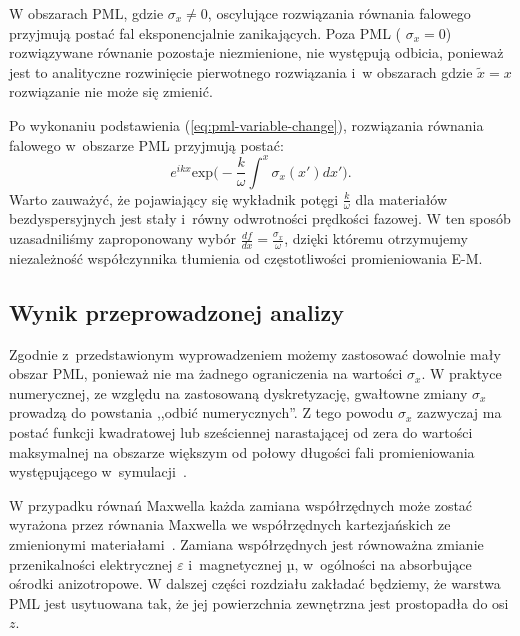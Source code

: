 W obszarach PML, gdzie $\sigma_x\ne0$, oscylujące rozwiązania równania falowego przyjmują postać fal eksponencjalnie zanikających. Poza PML ( $\sigma_x=0$) rozwiązywane równanie pozostaje niezmienione, nie występują odbicia, ponieważ jest to analityczne rozwinięcie pierwotnego rozwiązania i~w obszarach gdzie $\tilde{x}=x$ rozwiązanie nie może się zmienić.

Po wykonaniu podstawienia (\ref{eq:pml-variable-change}), rozwiązania równania falowego w~obszarze PML przyjmują postać:
\begin{equation}
e^{ikx}\textrm{exp}\Big(-\frac{k}{\omega}\int^x \sigma_x(x')dx'\Big).
\end{equation}
Warto zauważyć, że pojawiający się wykładnik potęgi $\frac{k}{\omega}$ dla materiałów bezdyspersyjnych jest stały i~równy odwrotności prędkości fazowej. W ten sposób uzasadniliśmy zaproponowany wybór $\frac{df}{dx}=\frac{\sigma_x}{\omega}$, dzięki któremu otrzymujemy niezależność współczynnika tłumienia od częstotliwości promieniowania E-M. 

\subsection{Wynik przeprowadzonej analizy}
Zgodnie z~przedstawionym wyprowadzeniem możemy zastosować dowolnie mały obszar PML, ponieważ nie ma żadnego ograniczenia na wartości $\sigma_x$. W praktyce numerycznej, ze względu na zastosowaną dyskretyzację, gwałtowne zmiany $\sigma_x$ prowadzą do powstania ,,odbić numerycznych''. Z tego powodu $\sigma_x$ zazwyczaj ma postać funkcji kwadratowej lub sześciennej narastającej od zera do wartości maksymalnej na obszarze większym od połowy długości fali promieniowania występującego w~symulacji~\cite{johnson2008notes}.

W przypadku równań Maxwella każda zamiana współrzędnych może zostać wyrażona przez równania Maxwella we współrzędnych kartezjańskich ze zmienionymi materiałami~\cite{ward1996refraction}. Zamiana współrzędnych jest równoważna zmianie przenikalności elektrycznej $\varepsilon$ i~magnetycznej µ, w~ogólności na absorbujące ośrodki anizotropowe. W dalszej części rozdziału zakładać będziemy, że warstwa PML jest usytuowana tak, że jej powierzchnia zewnętrzna jest prostopadła do osi $z$.

